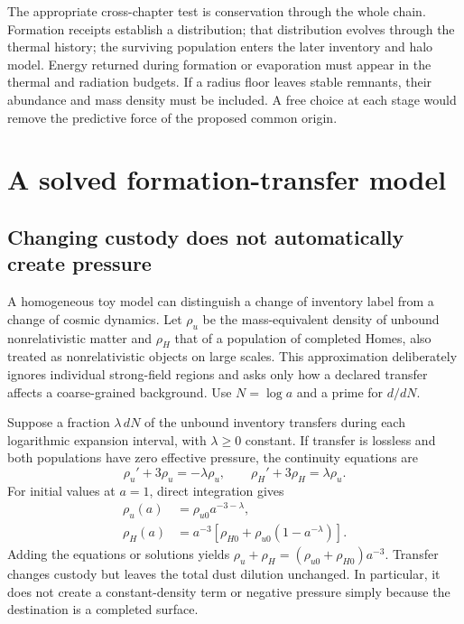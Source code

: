 The appropriate cross-chapter test is conservation through the whole chain. Formation receipts establish a distribution; that distribution evolves through the thermal history; the surviving population enters the later inventory and halo model. Energy returned during formation or evaporation must appear in the thermal and radiation budgets. If a radius floor leaves stable remnants, their abundance and mass density must be included. A free choice at each stage would remove the predictive force of the proposed common origin.

\section{A solved formation-transfer model}
\subsection{Changing custody does not automatically create pressure}
A homogeneous toy model can distinguish a change of inventory label from a change of cosmic dynamics. Let $\rho_u$ be the mass-equivalent density of unbound nonrelativistic matter and $\rho_H$ that of a population of completed Homes, also treated as nonrelativistic objects on large scales. This approximation deliberately ignores individual strong-field regions and asks only how a declared transfer affects a coarse-grained background. Use $N=\log a$ and a prime for $d/dN$.

Suppose a fraction $\lambda\,dN$ of the unbound inventory transfers during each logarithmic expansion interval, with $\lambda\geq0$ constant. If transfer is lossless and both populations have zero effective pressure, the continuity equations are
\begin{equation}
 \rho_u'+3\rho_u=-\lambda\rho_u,\qquad
 \rho_H'+3\rho_H=\lambda\rho_u.
 \label{c12:dusttransfer}
\end{equation}
For initial values at $a=1$, direct integration gives
\begin{align}
 \rho_u(a)&=\rho_{u0}a^{-3-\lambda},\label{c12:unboundsolution}\\
 \rho_H(a)&=a^{-3}\left[\rho_{H0}+\rho_{u0}(1-a^{-\lambda})\right].
 \label{c12:homesolution}
\end{align}
Adding the equations or solutions yields $\rho_u+\rho_H=(\rho_{u0}+\rho_{H0})a^{-3}$. Transfer changes custody but leaves the total dust dilution unchanged. In particular, it does not create a constant-density term or negative pressure simply because the destination is a completed surface.


